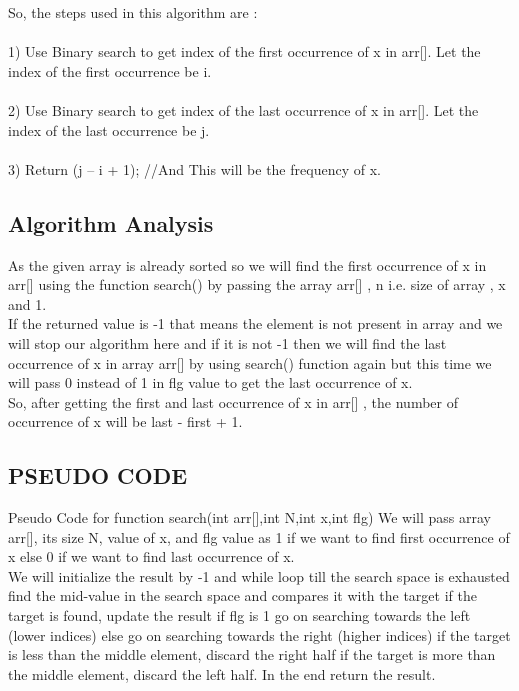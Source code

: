 \documentclass[conference]{IEEEtran}
\begin{document}
So, the steps used in this algorithm are : \\ \\
1) Use Binary search to get index of the first occurrence of x in arr[]. Let the index of the first occurrence be i. \\ \\ 
2) Use Binary search to get index of the last occurrence of x in arr[]. Let the index of the last occurrence be j.\\ \\
3) Return (j – i + 1); //And This will be the frequency of x.

\subsection{Algorithm Analysis}

As the given array is already sorted so we will find the first occurrence of x in arr[] using the function search() by passing the array arr[] , n i.e. size of array , x and 1. \\  If the returned value is -1 that means the element is not present in array and we will stop our algorithm here and if it is not -1 then we will find the last occurrence of x in array arr[] by using search() function again but this time we will pass 0 instead of 1 in flg value to get the last occurrence of x. \\  So, after getting the first and last occurrence of x in arr[] , the number of occurrence of x will be last - first + 1.

\subsection{PSEUDO CODE}\label{AA}
Pseudo Code for function search(int arr[],int N,int x,int flg)
We will pass array arr[], its size N, value of x, and flg value as 1 if we want to find first occurrence of x else 0 if we want to find last occurrence of x. \\
We will initialize the result by -1 and while loop till the search space is exhausted find the mid-value in the search space and compares it with the target if the target is found, update the result if flg is 1 go on searching towards the left (lower indices) else go on searching towards the right (higher indices) if the target is less than the middle element, discard the right half if the target is more than the middle element, discard the left half. In the end return the result.
\end{document}
